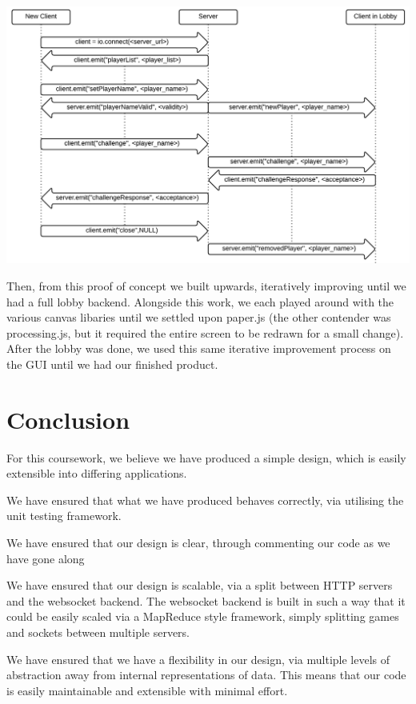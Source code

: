 \documentclass[a4wide, 11pt]{article}
\begin{document}
\includegraphics[width=\textwidth]{LobbyConnectionFlowchart.png}

Then, from this proof of concept we built upwards, iteratively improving until we had a full lobby backend. Alongside this work, we each played around with the various canvas libaries until we settled upon paper.js (the other contender was processing.js, but it required the entire screen to be redrawn for a small change). After the lobby was done, we used this same iterative improvement process on the GUI until we had our finished product.

\section{Conclusion}

For this coursework, we believe we have produced a simple design, which is easily extensible into differing applications.

We have ensured that what we have produced behaves correctly, via utilising the unit testing framework. 

We have ensured that our design is clear, through commenting our code as we have gone along

We have ensured that our design is scalable, via a split between HTTP servers and the websocket backend. The websocket backend is built in such a way that it could be easily scaled via a MapReduce style framework, simply splitting games and sockets between multiple servers.

We have ensured that we have a flexibility in our design, via multiple levels of abstraction away from internal representations of data. This means that our code is easily maintainable and extensible with minimal effort.
\end{document}
